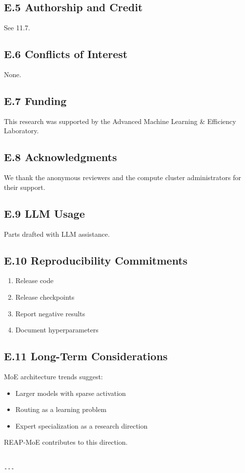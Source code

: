 \subsection{E.5 Authorship and Credit}

See  11.7.

\subsection{E.6 Conflicts of Interest}

None.

\subsection{E.7 Funding}

This research was supported by the Advanced Machine Learning \& Efficiency Laboratory.

\subsection{E.8 Acknowledgments}

We thank the anonymous reviewers and the compute cluster administrators for their support.

\subsection{E.9 LLM Usage}

Parts drafted with LLM assistance.

\subsection{E.10 Reproducibility Commitments}

\begin{enumerate}
\item Release code
\item Release checkpoints
\item Report negative results
\item Document hyperparameters

\end{enumerate}
\subsection{E.11 Long-Term Considerations}

MoE architecture trends suggest:
\begin{itemize}
\item Larger models with sparse activation
\item Routing as a learning problem
\item Expert specialization as a research direction

\end{itemize}
REAP-MoE contributes to this direction.
\begin{lstlisting}

---
\end{lstlisting}